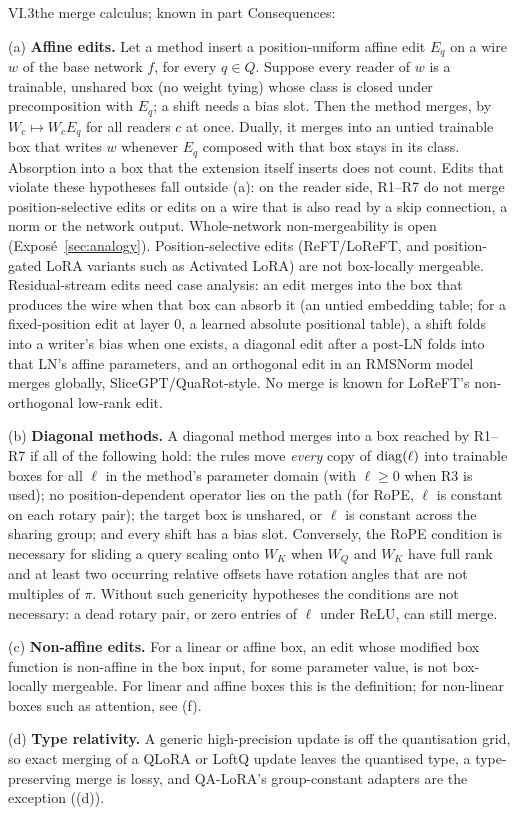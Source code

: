 \begin{theorem}{VI.3}{the merge calculus; known in part}
Consequences:

(a) \textbf{Affine edits.} Let a method insert a position-uniform affine edit $E_q$ on a wire $w$ of the base network
$f$, for every $q\in Q$. Suppose every reader of $w$ is a trainable, unshared box (no weight tying) whose class is closed
under precomposition with $E_q$; a shift needs a bias slot. Then the method merges, by $W_c\mapsto W_cE_q$ for all
readers $c$ at once. Dually, it merges into an untied trainable box that writes $w$ whenever $E_q$ composed with that box
stays in its class. Absorption into a box that the extension itself inserts does not count. Edits that violate these
hypotheses fall outside (a): on the reader side, R1--R7 do not merge position-selective edits or edits on a wire that is
also read by a skip connection, a norm or the network output. Whole-network non-mergeability is open
(Exposé~\ref{sec:analogy}). Position-selective edits (ReFT/LoReFT, and position-gated LoRA variants such as Activated
LoRA) are not box-locally mergeable. Residual-stream edits need case analysis: an edit merges into the box that produces
the wire when that box can absorb it (an untied embedding table; for a fixed-position edit at layer $0$, a learned
absolute positional table), a shift folds into a writer's bias when one exists, a diagonal edit after a post-LN folds
into that LN's affine parameters, and an orthogonal edit in an RMSNorm model merges globally, SliceGPT/QuaRot-style. No
merge is known for LoReFT's non-orthogonal low-rank edit.

(b) \textbf{Diagonal methods.} A diagonal method merges into a box reached by R1--R7 if all of the following hold: the
rules move \emph{every} copy of $\operatorname{diag}(\ell)$ into trainable boxes for all $\ell$ in the method's parameter domain (with
$\ell\ge0$ when R3 is used); no position-dependent operator lies on the path (for RoPE, $\ell$ is constant on each rotary
pair); the target box is unshared, or $\ell$ is constant across the sharing group; and every shift has a bias slot.
Conversely, the RoPE condition is necessary for sliding a query scaling onto $W_K$ when $W_Q$ and $W_K$ have full rank and
at least two occurring relative offsets have rotation angles that are not multiples of $\pi$. Without such genericity
hypotheses the conditions are not necessary: a dead rotary pair, or zero entries of $\ell$ under ReLU, can still merge.

(c) \textbf{Non-affine edits.} For a linear or affine box, an edit whose modified box function is non-affine in the box
input, for some parameter value, is not box-locally mergeable. For linear and affine boxes this is the definition; for
non-linear boxes such as attention, see (f).

(d) \textbf{Type relativity.} A generic high-precision update is off the quantisation grid, so exact merging of a QLoRA
or LoftQ update leaves the quantised type, a type-preserving merge is lossy, and QA-LoRA's group-constant adapters are
the exception ((d)).
\end{theorem}

